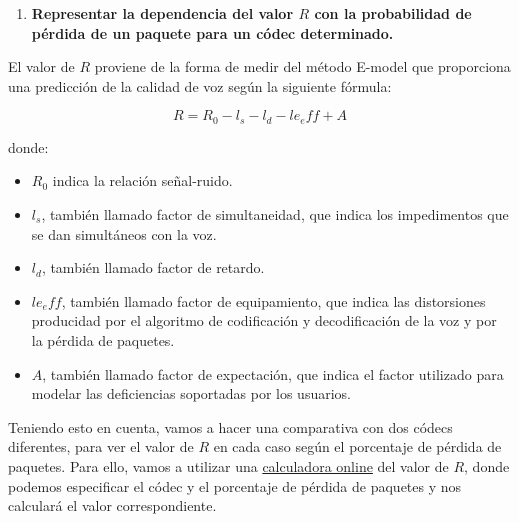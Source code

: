 \documentclass[11pt,a4paper]{article}
\begin{document}
\newpage

\begin{enumerate}
	\item \textbf{Representar la dependencia del valor $R$ con la probabilidad de pérdida de un paquete para un códec determinado.}
\end{enumerate}

El valor de $R$ proviene de la forma de medir del método E-model que proporciona una predicción de la calidad de voz según la siguiente fórmula:

\[R=R_0-l_s-l_d-le_eff+A\]

donde:

\begin{itemize}
	\item $R_0$ indica la relación señal-ruido.
	\item $l_s$, también llamado factor de simultaneidad, que indica los impedimentos que se dan simultáneos con la voz.
	\item $l_d$, también llamado factor de retardo.
	\item $le_eff$, también llamado factor de equipamiento, que indica las distorsiones producidad por el algoritmo de codificación y decodificación de la voz y por la pérdida de paquetes.
	\item $A$, también llamado factor de expectación, que indica el factor utilizado para modelar las deficiencias soportadas por los usuarios.
\end{itemize}

Teniendo esto en cuenta, vamos a hacer una comparativa con dos códecs diferentes, para ver el valor de $R$ en cada caso según el porcentaje de pérdida de paquetes. Para ello, vamos a utilizar una \color{blue}\href{https://www.voiptroubleshooter.com/diagnosis/emodel.html}{calculadora online} \color{black}del valor de $R$, donde podemos especificar el códec y el porcentaje de pérdida de paquetes y nos calculará el valor correspondiente.
\end{document}
